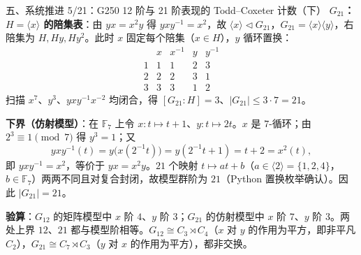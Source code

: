 \documentclass[aspectratio=169,10pt,fontset=none]{ctexbeamer}
\newcommand{\key}[1]{\textcolor{ink}{\bfseries #1}}
\begin{document}
\begin{frame}[t]{五、系统推进 5/21：G250 12 阶与 21 阶表现的 Todd–Coxeter 计数（下）}
\scriptsize
\key{$G_{21}$：$H=\langle x\rangle$ 的陪集表}：由 $yx=x^2y$ 得 $yxy^{-1}=x^2$，故 $\langle x\rangle\triangleleft G_{21}$，$G_{21}=\langle x\rangle\langle y\rangle$，右陪集为 $H,Hy,Hy^2$。此时 $x$ 固定每个陪集（$x\in H$），$y$ 循环置换：
\[ \begin{array}{c|cccc}
 & x & x^{-1} & y & y^{-1}\\\hline
1 & 1 & 1 & 2 & 3\\
2 & 2 & 2 & 3 & 1\\
3 & 3 & 3 & 1 & 2
\end{array} \]
扫描 $x^7$、$y^3$、$yxy^{-1}x^{-2}$ 均闭合，得 $[G_{21}:H]=3$、$|G_{21}|\le3\cdot7=21$。

\key{下界（仿射模型）}：在 $\mathbb F_7$ 上令 $x:t\mapsto t+1$、$y:t\mapsto2t$。$x$ 是 $7$-循环；由 $2^3\equiv1\pmod7$ 得 $y^3=1$；又
\[ yxy^{-1}(t)=y\bigl(x(2^{-1}t)\bigr)=y(2^{-1}t+1)=t+2=x^2(t), \]
即 $yxy^{-1}=x^2$，等价于 $yx=x^2y$。$21$ 个映射 $t\mapsto at+b$（$a\in\langle2\rangle=\{1,2,4\}$，$b\in\mathbb F_7$）两两不同且对复合封闭，故模型群阶为 $21$（Python 置换枚举确认）。因此 $|G_{21}|=21$。

\key{验算}：$G_{12}$ 的矩阵模型中 $x$ 阶 $4$、$y$ 阶 $3$；$G_{21}$ 的仿射模型中 $x$ 阶 $7$、$y$ 阶 $3$。两处上界 $12$、$21$ 都与模型阶相等。$G_{12}\cong C_3\rtimes C_4$（$x$ 对 $y$ 的作用为平方，即非平凡 $C_2$），$G_{21}\cong C_7\rtimes C_3$（$y$ 对 $x$ 的作用为平方），都非交换。
\end{frame}
\end{document}
